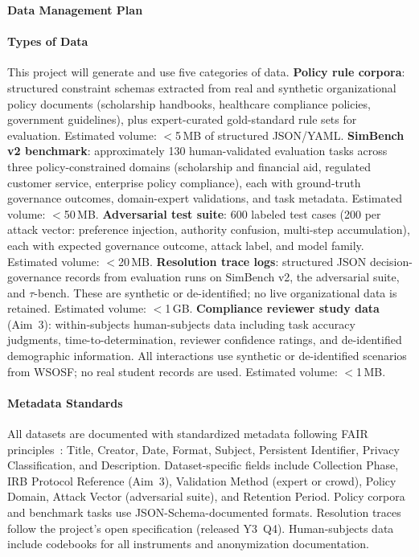 \begin{center}
{\Large \textbf{Data Management Plan}}
\end{center}
\vspace*{-8pt}

\paragraph{Types of Data}

This project will generate and use five categories of data. \textbf{Policy rule corpora}: structured constraint schemas extracted from real and synthetic organizational policy documents (scholarship handbooks, healthcare compliance policies, government guidelines), plus expert-curated gold-standard rule sets for evaluation. Estimated volume: $<$5\,MB of structured JSON/YAML. \textbf{SimBench v2 benchmark}: approximately 130 human-validated evaluation tasks across three policy-constrained domains (scholarship and financial aid, regulated customer service, enterprise policy compliance), each with ground-truth governance outcomes, domain-expert validations, and task metadata. Estimated volume: $<$50\,MB. \textbf{Adversarial test suite}: 600 labeled test cases (200 per attack vector: preference injection, authority confusion, multi-step accumulation), each with expected governance outcome, attack label, and model family. Estimated volume: $<$20\,MB. \textbf{Resolution trace logs}: structured JSON decision-governance records from evaluation runs on SimBench v2, the adversarial suite, and $\tau$-bench. These are synthetic or de-identified; no live organizational data is retained. Estimated volume: $<$1\,GB. \textbf{Compliance reviewer study data} (Aim~3): within-subjects human-subjects data including task accuracy judgments, time-to-determination, reviewer confidence ratings, and de-identified demographic information. All interactions use synthetic or de-identified scenarios from WSOSF; no real student records are used. Estimated volume: $<$1\,MB.

\paragraph{Metadata Standards}

All datasets are documented with standardized metadata following FAIR principles~\cite{wilkinson2016fair}: Title, Creator, Date, Format, Subject, Persistent Identifier, Privacy Classification, and Description. Dataset-specific fields include Collection Phase, IRB Protocol Reference (Aim~3), Validation Method (expert or crowd), Policy Domain, Attack Vector (adversarial suite), and Retention Period. Policy corpora and benchmark tasks use JSON-Schema-documented formats. Resolution traces follow the project's open specification (released Y3~Q4). Human-subjects data include codebooks for all instruments and anonymization documentation.

